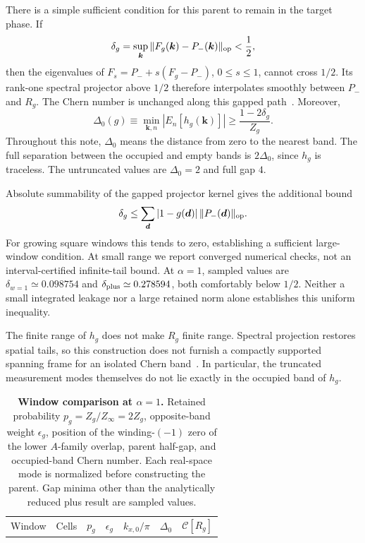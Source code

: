 \documentclass[aps,prb,onecolumn,nofootinbib,superscriptaddress]{revtex4-2}
\newcommand{\bk}{\boldsymbol{k}}
\newcommand{\bd}{\boldsymbol{d}}
\newcommand{\Chern}{\mathcal{C}}
\begin{document}
There is a simple sufficient condition for this parent to remain in the target phase. If
\begin{equation}
 \delta_g=\sup_{\bk}\|F_g(\bk)-P_-(\bk)\|_{\rm op}<\frac12,
 \label{eq:error}
\end{equation}
then the eigenvalues of $F_s=P_-+s(F_g-P_-)$, $0\le s\le1$, cannot cross $1/2$. Its rank-one spectral projector above $1/2$ therefore interpolates smoothly between $P_-$ and $R_g$. The Chern number is unchanged along this gapped path~\cite{Avron1983}. Moreover,
\begin{equation}
 \Delta_0(g)\equiv\min_{\bk,n}|E_n[h_g(\bk)]|
 \ge\frac{1-2\delta_g}{Z_g}.
 \label{eq:gapbound}
\end{equation}
Throughout this note, $\Delta_0$ means the distance from zero to the nearest band. The full separation between the occupied and empty bands is $2\Delta_0$, since $h_g$ is traceless. The untruncated values are $\Delta_0=2$ and full gap $4$.

Absolute summability of the gapped projector kernel gives the additional bound
\begin{equation}
 \delta_g\le\sum_{\bd}|1-g(\bd)|\,\|P_-(\bd)\|_{\rm op}.
\end{equation}
For growing square windows this tends to zero, establishing a sufficient large-window condition. At small range we report converged numerical checks, not an interval-certified infinite-tail bound. At $\alpha=1$, sampled values are $\delta_{w=1}\simeq0.098754$ and $\delta_{\rm plus}\simeq0.278594$, both comfortably below $1/2$. Neither a small integrated leakage nor a large retained norm alone establishes this uniform inequality.

The finite range of $h_g$ does not make $R_g$ finite range. Spectral projection restores spatial tails, so this construction does not furnish a compactly supported spanning frame for an isolated Chern band~\cite{DubailRead2015}. In particular, the truncated measurement modes themselves do not lie exactly in the occupied band of $h_g$.

\begin{table}[tb]
 \caption{\textbf{Window comparison at $\alpha=1$.} Retained probability $p_g=Z_g/Z_\infty=2Z_g$, opposite-band weight $\epsilon_g$, position of the winding-$(-1)$ zero of the lower $A$-family overlap, parent half-gap, and occupied-band Chern number. Each real-space mode is normalized before constructing the parent. Gap minima other than the analytically reduced plus result are sampled values.}
 \label{tab:comparison}
 \begin{ruledtabular}
 \begin{tabular}{lrrrrrr}
 Window & Cells & $p_g$ & $\epsilon_g$ & $k_{x,0}/\pi$ & $\Delta_0$ & $\Chern[R_g]$ \\
 
 \end{tabular}
 \end{ruledtabular}
\end{table}
\end{document}
